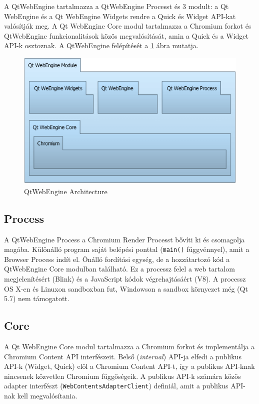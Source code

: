 \documentclass[12pt]{report}
\begin{document}
A QtWebEngine tartalmazza a QtWebEngine Processt és 3 modult: a Qt WebEngine és a
Qt WebEngine Widgets rendre a Quick és Widget API-kat valósítják meg. A Qt WebEngine Core
modul tartalmazza a Chromium forkot és QtWebEngine funkcionalitások közös megvalósítását,
amin a Quick és a Widget API-k osztoznak. A QtWebEngine felépítését a
\ref{fig:qtwebengine-architecture} ábra mutatja.

\begin{figure}[ht]
    \centering
    \includegraphics[scale=0.75]{qtwebengine-architecture}
    \caption{
        \label{fig:qtwebengine-architecture}
        QtWebEngine Architecture \cite{bib:qt-doc-webengine-overview}
    }
\end{figure}

\subsection{Process}
A QtWebEngine Process \cite{bib:qt-doc-qt-webengine-process} a Chromium Render Processt
bővíti ki és csomagolja magába. Különálló program saját belépési ponttal (\texttt{main()}
függvénnyel), amit a Browser Process indít el. Önálló fordítási egység, de a hozzátartozó kód
a QtWebEngine Core modulban található. Ez a processz felel a web tartalom megjelenítésért
(Blink) és a JavaScript kódok végrehajtásáért (V8). A processz OS X-en és Linuxon sandboxban
fut, Windowson a sandbox környezet még (Qt 5.7) nem támogatott.

\subsection{Core}
A Qt WebEngine Core modul \cite{bib:qt-doc-qt-webengine-core} tartalmazza a Chromium forkot
és implementálja a Chromium Content API interfészeit. Belső (\textit{internal}) API-ja elfedi
a publikus API-k (Widget, Quick) elől a Chromium Content API-t, így a publikus API-knak
nincsenek közvetlen Chromium függőségeik. A publikus API-k számára közös adapter interfészt
(\texttt{WebContentsAdapterClient}) definiál, amit a publikus API-nak kell megvalósítania.
\end{document}
